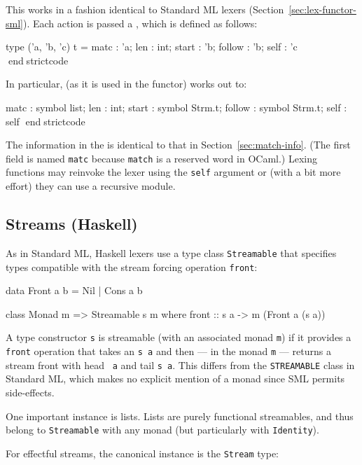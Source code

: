 \documentclass[10pt]{article}
\begin{document}
\begin{strictcode}
\begin{strictcode}
This works in a fashion identical to Standard ML lexers
(Section~\ref{sec:lex-functor-sml}).  Each action is passed a 
, which is defined as follows:

\begin{strictcode}
type ('a, 'b, 'c) t =
   { matc : 'a;
     len : int;
     start : 'b;
     follow : 'b;
     self : 'c }
endstrictcode

In particular,  (as
it is used in the functor) works out to:

\begin{strictcode}
   { matc : symbol list;
     len : int;
     start : symbol Strm.t;
     follow : symbol Strm.t;
     self : self }
endstrictcode

The information in the  is identical to that in
Section~\ref{sec:match-info}.  (The first field is named {\tt matc}
because {\tt match} is a reserved word in OCaml.)  Lexing functions
may reinvoke the lexer using the {\tt self} argument or (with a bit
more effort) they can use a recursive module.




\subsection{Streams (Haskell)}

As in Standard ML, Haskell lexers use a type class {\tt Streamable} that
specifies types compatible with the stream forcing operation {\tt front}:

\begin{code}
data Front a b =
   Nil 
 | Cons a b

class Monad m => Streamable s m where
   front :: s a -> m (Front a (s a))
\end{code}


A type constructor {\tt s} is streamable (with an associated monad
{\tt m}) if it provides a {\tt front} operation that takes an {\tt s
a} and then --- in the monad {\tt m} --- returns a stream front with head {\tt
a} and tail {\tt s a}.  This differs from the {\tt STREAMABLE} class
in Standard ML, which makes no explicit mention of a monad since SML
permits side-effects.

One important instance is lists.  Lists are purely functional
streamables, and thus belong to {\tt Streamable} with any monad (but
particularly with {\tt Identity}).

For effectful streams, the canonical instance is the {\tt Stream} type:


\end{strictcode}
\end{strictcode}
\end{strictcode}
\end{strictcode}
\end{document}
